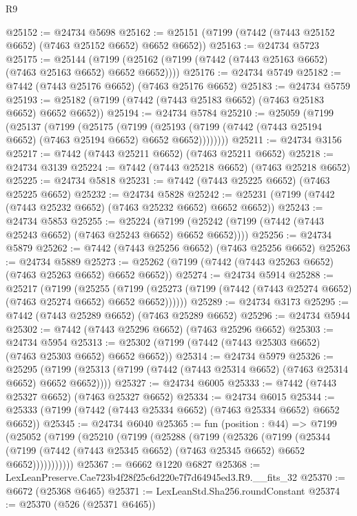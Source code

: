\begin{lexlean}{R9}
\begin{coremodule}
@25152 := @24734 @5698
@25162 := @25151 (@7199 (@7442 (@7443 @25152 @6652) (@7463 @25152 @6652) @6652 @6652))
@25163 := @24734 @5723
@25175 := @25144
    (@7199 (@25162 (@7199 (@7442 (@7443 @25163 @6652) (@7463 @25163 @6652) @6652 @6652))))
@25176 := @24734 @5749
@25182 := @7442 (@7443 @25176 @6652) (@7463 @25176 @6652)
@25183 := @24734 @5759
@25193 := @25182 (@7199 (@7442 (@7443 @25183 @6652) (@7463 @25183 @6652) @6652 @6652))
@25194 := @24734 @5784
@25210 := @25059
    (@7199
      (@25137
        (@7199
          (@25175
            (@7199
              (@25193 (@7199 (@7442 (@7443 @25194 @6652) (@7463 @25194 @6652) @6652 @6652))))))))
@25211 := @24734 @3156
@25217 := @7442 (@7443 @25211 @6652) (@7463 @25211 @6652)
@25218 := @24734 @3139
@25224 := @7442 (@7443 @25218 @6652) (@7463 @25218 @6652)
@25225 := @24734 @5818
@25231 := @7442 (@7443 @25225 @6652) (@7463 @25225 @6652)
@25232 := @24734 @5828
@25242 := @25231 (@7199 (@7442 (@7443 @25232 @6652) (@7463 @25232 @6652) @6652 @6652))
@25243 := @24734 @5853
@25255 := @25224
    (@7199 (@25242 (@7199 (@7442 (@7443 @25243 @6652) (@7463 @25243 @6652) @6652 @6652))))
@25256 := @24734 @5879
@25262 := @7442 (@7443 @25256 @6652) (@7463 @25256 @6652)
@25263 := @24734 @5889
@25273 := @25262 (@7199 (@7442 (@7443 @25263 @6652) (@7463 @25263 @6652) @6652 @6652))
@25274 := @24734 @5914
@25288 := @25217
    (@7199
      (@25255
        (@7199 (@25273 (@7199 (@7442 (@7443 @25274 @6652) (@7463 @25274 @6652) @6652 @6652))))))
@25289 := @24734 @3173
@25295 := @7442 (@7443 @25289 @6652) (@7463 @25289 @6652)
@25296 := @24734 @5944
@25302 := @7442 (@7443 @25296 @6652) (@7463 @25296 @6652)
@25303 := @24734 @5954
@25313 := @25302 (@7199 (@7442 (@7443 @25303 @6652) (@7463 @25303 @6652) @6652 @6652))
@25314 := @24734 @5979
@25326 := @25295
    (@7199 (@25313 (@7199 (@7442 (@7443 @25314 @6652) (@7463 @25314 @6652) @6652 @6652))))
@25327 := @24734 @6005
@25333 := @7442 (@7443 @25327 @6652) (@7463 @25327 @6652)
@25334 := @24734 @6015
@25344 := @25333 (@7199 (@7442 (@7443 @25334 @6652) (@7463 @25334 @6652) @6652 @6652))
@25345 := @24734 @6040
@25365 := fun (position : @44) =>
  @7199
    (@25052
      (@7199
        (@25210
          (@7199
            (@25288
              (@7199
                (@25326
                  (@7199
                    (@25344
                      (@7199 (@7442 (@7443 @25345 @6652) (@7463 @25345 @6652) @6652 @6652)))))))))))
@25367 := @6662 @1220 @6827
@25368 := LexLeanPreserve.Cae723b4f28f25c6d220e7f7d64945ed3.R9.__fits_32
@25370 := @6672 (@25368 @6465)
@25371 := LexLeanStd.Sha256.roundConstant
@25374 := @25370 (@526 (@25371 @6465))

\end{coremodule}
\end{lexlean}
